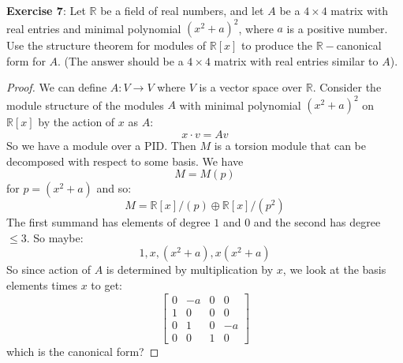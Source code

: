 \documentclass{article}
\begin{document}
\textbf{Exercise 7}: Let $\mathbb{R}$ be a field of real numbers, and let $A$ be a $4 \times 4$ matrix with real entries and minimal polynomial $(x^{2} + a)^{2}$, where $a$ is a positive number. Use the structure theorem for modules of $\mathbb{R}[x]$ to produce the $\mathbb{R}-$canonical form for $A$. (The answer should be a $4 \times 4$ matrix with real entries similar to $A$).
    \begin{proof}
        We can define $A : V \rightarrow V$ where $V$ is a vector space over $\mathbb{R}$. Consider the module structure of the modules $A$ with minimal polynomial $(x^{2} + a)^{2}$ on $\mathbb{R}[x]$ by the action of $x$ as $A$:
            \begin{equation*}
                x \cdot v = Av
            \end{equation*}
        So we have a module over a PID. Then $M$ is a torsion module that can be decomposed with respect to some basis. We have
            \begin{equation*}
                M = M(p)
            \end{equation*}
        for $p = (x^{2} + a)$ and so:
            \begin{equation*}
                M = \mathbb{R}[x]/(p) \oplus \mathbb{R}[x]/(p^{2})
            \end{equation*}
        The first summand has elements of degree $1$ and $0$ and the second has degree $\leq 3$. So maybe:
        \begin{equation*}
            1, x, (x^{2} + a), x(x^{2} + a)
        \end{equation*}
    So since action of $A$ is determined by multiplication by $x$, we look at the basis elements times $x$ to get:
            \begin{equation*}
                \begin{bmatrix}
                    0 & -a & 0 & 0 \\
                    1 & 0  & 0 & 0  \\
                    0 & 1  & 0 & -a  \\
                    0 & 0  & 1 & 0    
                \end{bmatrix}
            \end{equation*}
        which is the canonical form?
    \end{proof}
\end{document}
